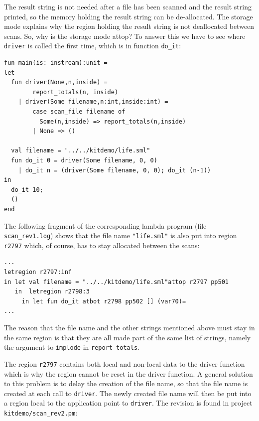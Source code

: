 \documentclass[12pt]{book}
\begin{document}
The result string is not needed after a file has been scanned and the
result string printed, so the memory holding the result string can be
de-allocated. The {\attop} storage mode explains why the region holding the
result string is not deallocated between scans. So, why is the storage mode
attop? To answer this we have to see where \texttt{driver} is called the
first time, which is in function \texttt{do\_it}:

\begin{verbatim}
fun main(is: instream):unit =
let 
  fun driver(None,n,inside) = 
        report_totals(n, inside)
    | driver(Some filename,n:int,inside:int) =
        case scan_file filename of
          Some(n,inside) => report_totals(n,inside)
        | None => ()

  val filename = "../../kitdemo/life.sml"
  fun do_it 0 = driver(Some filename, 0, 0)
    | do_it n = (driver(Some filename, 0, 0); do_it (n-1))
in
  do_it 10;
  ()
end
\end{verbatim}
\noindent
The following fragment of the corresponding lambda program (file
\texttt{scan\_rev1.log}) shows that the file name \texttt{"life.sml"} is
also put into region \texttt{r2797} which, of course, has to stay allocated
between the scans:

\begin{verbatim}
...
letregion r2797:inf 
in let val filename = "../../kitdemo/life.sml"attop r2797 pp501
   in  letregion r2798:3 
     in let fun do_it atbot r2798 pp502 [] (var70)= 
...
\end{verbatim}                                
\noindent
The reason that the file name and the other strings mentioned above must
stay in the same region is that they are all made part of the same list of
strings, namely the argument to \texttt{implode} in \texttt{report\_totals}.

The region \texttt{r2797} contains both local and non-local data to the
driver function which is why the region cannot be reset in the driver
function.  A general solution to this problem is to delay the creation of
the file name, so that the file name is created at each call to
\texttt{driver}. The newly created file name will then be put into a region local
to the application point to \texttt{driver}. The revision is found in
project \texttt{kitdemo/scan\_rev2.pm}:
\end{document}
